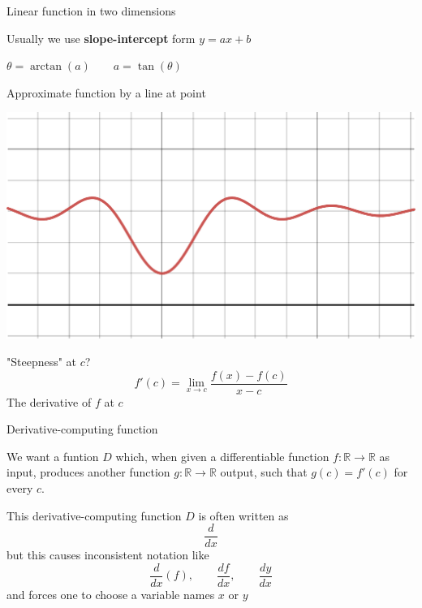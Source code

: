 \documentclass[12pt,aspectratio=169]{beamer}
\begin{document}
\begin{frame}{Linear function in two dimensions}

Usually we use \textbf{slope-intercept} form $y= a x + b$



$\theta = \arctan (a) \qquad a = \tan (\theta)$
	
\end{frame}



\begin{frame}{Approximate function by a line at point}


\includegraphics[width=0.7\linewidth]{img/desmos-graph1.pdf}




"Steepness" at $c$?
$$f'(c) = \lim_{x \to c} \frac{f(x) - f(c)}{x - c}$$
The derivative of $f$ at $c$





\end{frame}


\begin{frame}{Derivative-computing function}

We want a funtion $D$ which, when given a differentiable function $f : \mathbb{R} \to \mathbb{R}$ as input, produces another function $g : \mathbb{R} \to \mathbb{R}$ output, such that $g(c) = f'(c)$ for every $c$.

\bigskip
\pause
This derivative-computing function $D$ is often written as 
$$\frac{d}{dx}$$
but this causes inconsistent notation like
$$\frac{d}{dx}(f), \qquad \frac{df}{dx}, \qquad \frac{dy}{dx}$$
and forces one to choose a variable names $x$ or $y$
	
\end{frame}
\end{document}
